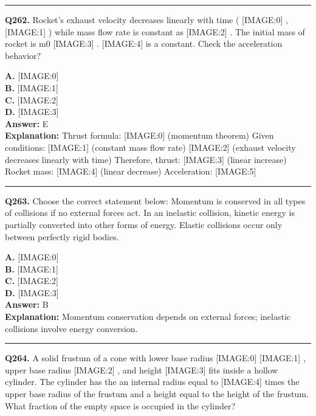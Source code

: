 \documentclass[12pt]{article}
\begin{document}
\hrule
\vspace{1em}


\noindent
\textbf{Q262.} Rocket's exhaust velocity decreases linearly with time (
[IMAGE:0]
,
[IMAGE:1]
) while mass flow rate is constant as
[IMAGE:2]
. The initial mass of rocket is m0
[IMAGE:3]
.
[IMAGE:4]
is a constant.
Check the acceleration behavior?



\textbf{A.} [IMAGE:0] \\
\textbf{B.} [IMAGE:1] \\
\textbf{C.} [IMAGE:2] \\
\textbf{D.} [IMAGE:3] \\

\textbf{Answer:} E \\
\textbf{Explanation:} Thrust formula:
[IMAGE:0]
(momentum theorem)
Given conditions:
[IMAGE:1]
(constant mass flow rate)
[IMAGE:2]
(exhaust velocity decreases linearly with time)
Therefore, thrust:
[IMAGE:3]
(linear increase)
Rocket mass:
[IMAGE:4]
(linear decrease)
Acceleration:
[IMAGE:5]

\hrule
\vspace{1em}


\noindent
\textbf{Q263.} Choose the correct statement below:
Momentum is conserved in all types of collisions if no external forces act.
In an inelastic collision, kinetic energy is partially converted into other forms of energy.
Elastic collisions occur only between perfectly rigid bodies.



\textbf{A.} [IMAGE:0] \\
\textbf{B.} [IMAGE:1] \\
\textbf{C.} [IMAGE:2] \\
\textbf{D.} [IMAGE:3] \\

\textbf{Answer:} B \\
\textbf{Explanation:} Momentum conservation depends on external forces; inelastic collisions involve energy conversion.

\hrule
\vspace{1em}


\noindent
\textbf{Q264.} A solid frustum of a cone with lower base radius
[IMAGE:0]
[IMAGE:1]
, upper base radius
[IMAGE:2]
, and height
[IMAGE:3]
fits inside a hollow cylinder. The cylinder has the an internal radius equal to
[IMAGE:4]
times the upper base radius of the frustum and a height equal to the height of the frustum. What fraction of the empty space is occupied in the cylinder?
\end{document}
